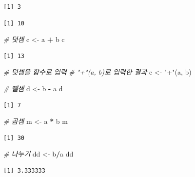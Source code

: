 \documentclass[
  11pt,
]{krantz}
\newenvironment{Shaded}{\begin{snugshade}}{\end{snugshade}}
\newcommand{\CommentTok}[1]{\textcolor[rgb]{0.37,0.37,0.37}{\textit{#1}}}
\newcommand{\NormalTok}[1]{#1}
\newcommand{\OperatorTok}[1]{\textcolor[rgb]{0.43,0.43,0.43}{\textbf{#1}}}
\newcommand{\StringTok}[1]{\textcolor[rgb]{0.5,0.5,0.5}{#1}}
\begin{document}
\begin{verbatim}
[1] 3
\end{verbatim}

\begin{verbatim}
[1] 10
\end{verbatim}

\begin{Shaded}
\begin{Highlighting}[]
\CommentTok{# 덧셈}
\NormalTok{c <-}\StringTok{ }\NormalTok{a }\OperatorTok{+}\StringTok{ }\NormalTok{b}
\NormalTok{c}
\end{Highlighting}
\end{Shaded}

\begin{verbatim}
[1] 13
\end{verbatim}

\begin{Shaded}
\begin{Highlighting}[]
\CommentTok{# 덧셈을 함수로 입력}
\CommentTok{# "+"(a, b)로 입력한 결과}
\NormalTok{c <-}\StringTok{ "+"}\NormalTok{(a, b)}

\CommentTok{# 뺄셈}
\NormalTok{d <-}\StringTok{ }\NormalTok{b }\OperatorTok{-}\StringTok{ }\NormalTok{a}
\NormalTok{d}
\end{Highlighting}
\end{Shaded}

\begin{verbatim}
[1] 7
\end{verbatim}

\begin{Shaded}
\begin{Highlighting}[]
\CommentTok{# 곱셈}
\NormalTok{m <-}\StringTok{ }\NormalTok{a }\OperatorTok{*}\StringTok{ }\NormalTok{b}
\NormalTok{m}
\end{Highlighting}
\end{Shaded}

\begin{verbatim}
[1] 30
\end{verbatim}

\begin{Shaded}
\begin{Highlighting}[]
\CommentTok{# 나누기}
\NormalTok{dd <-}\StringTok{ }\NormalTok{b}\OperatorTok{/}\NormalTok{a}
\NormalTok{dd}
\end{Highlighting}
\end{Shaded}

\begin{verbatim}
[1] 3.333333
\end{verbatim}
\end{document}
